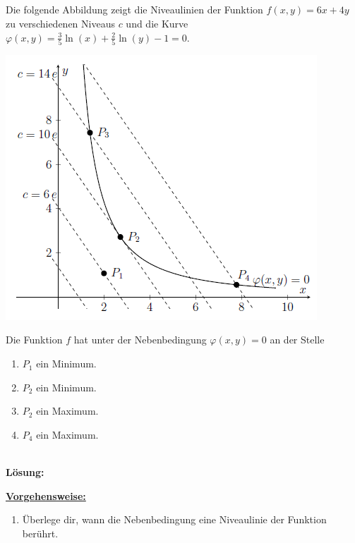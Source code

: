 \subsection*{}
Die folgende Abbildung zeigt die Niveaulinien der Funktion $ f(x,y ) = 6x + 4y  $ zu verschiedenen Niveaus $ c $ und die Kurve $ \varphi(x,y) = \frac{3}{5} \ln(x) + \frac{2}{5} \ln(y) - 1 = 0 $.
\begin{center}
	\includegraphics{pictures/frage2_3_aufgabe.png}
\end{center}
Die Funktion $ f $ hat unter der Nebenbedingung $ \varphi(x,y) = 0 $ an der Stelle
\renewcommand{\labelenumi}{(\alph{enumi})}
\begin{enumerate}
	\item 
	$ P_1 $ ein Minimum.
	\item 
	$ P_2 $ ein Minimum.
	\item 
	$ P_2 $ ein Maximum.
	\item
	$ P_4 $ ein Maximum.
\end{enumerate}
\ \\
\textbf{Lösung:}
\begin{mdframed}
\underline{\textbf{Vorgehensweise:}}
\renewcommand{\labelenumi}{\theenumi.}
\begin{enumerate}
\item Überlege dir, wann die Nebenbedingung eine Niveaulinie der Funktion berührt.

\end{enumerate}
\end{mdframed}

